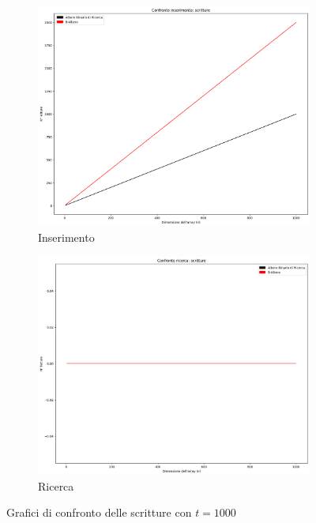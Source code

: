 \begin{figure}[H]
    \centering
    \begin{subfigure}[b]{0.49\textwidth}
        \centering
        \includegraphics[width=\textwidth]{comparison-graphs/insert-w-t1000.png}
        \caption{Inserimento}
        \label{fig:compgraphinsertwrite1000}
    \end{subfigure}
    \hfill
    \begin{subfigure}[b]{0.49\textwidth}
        \centering
        \includegraphics[width=\textwidth]{comparison-graphs/search-w-t1000.png}
        \caption{Ricerca}
        \label{fig:compgraphsearchwrite1000}
    \end{subfigure}
    \caption{Grafici di confronto delle scritture con $t=1000$}
    \label{fig:compgraphread1000}
\end{figure}



